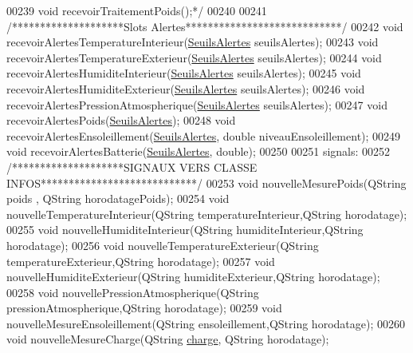 \begin{DoxyCode}
00239 \textcolor{comment}{        void recevoirTraitementPoids();*/}
00240 
00241         \textcolor{comment}{/********************Slots Alertes****************************/}
00242         \textcolor{keywordtype}{void} recevoirAlertesTemperatureInterieur(\hyperlink{parametres_8h_aaa6de8207c94675264c90b10b613368d}{SeuilsAlertes} seuilsAlertes);
00243         \textcolor{keywordtype}{void} recevoirAlertesTemperatureExterieur(\hyperlink{parametres_8h_aaa6de8207c94675264c90b10b613368d}{SeuilsAlertes} seuilsAlertes);
00244         \textcolor{keywordtype}{void} recevoirAlertesHumiditeInterieur(\hyperlink{parametres_8h_aaa6de8207c94675264c90b10b613368d}{SeuilsAlertes} seuilsAlertes);
00245         \textcolor{keywordtype}{void} recevoirAlertesHumiditeExterieur(\hyperlink{parametres_8h_aaa6de8207c94675264c90b10b613368d}{SeuilsAlertes} seuilsAlertes);
00246         \textcolor{keywordtype}{void} recevoirAlertesPressionAtmospherique(\hyperlink{parametres_8h_aaa6de8207c94675264c90b10b613368d}{SeuilsAlertes} seuilsAlertes);
00247         \textcolor{keywordtype}{void} recevoirAlertesPoids(\hyperlink{parametres_8h_aaa6de8207c94675264c90b10b613368d}{SeuilsAlertes});
00248         \textcolor{keywordtype}{void} recevoirAlertesEnsoleillement(\hyperlink{parametres_8h_aaa6de8207c94675264c90b10b613368d}{SeuilsAlertes}, \textcolor{keywordtype}{double} niveauEnsoleillement);
00249         \textcolor{keywordtype}{void} recevoirAlertesBatterie(\hyperlink{parametres_8h_aaa6de8207c94675264c90b10b613368d}{SeuilsAlertes}, \textcolor{keywordtype}{double});
00250 
00251     signals:
00252         \textcolor{comment}{/********************SIGNAUX VERS CLASSE INFOS****************************/}
00253         \textcolor{keywordtype}{void} nouvelleMesurePoids(QString poids , QString horodatagePoids); 
00254         \textcolor{keywordtype}{void} nouvelleTemperatureInterieur(QString temperatureInterieur,QString horodatage); 
00255         \textcolor{keywordtype}{void} nouvelleHumiditeInterieur(QString humiditeInterieur,QString horodatage); 
00256         \textcolor{keywordtype}{void} nouvelleTemperatureExterieur(QString temperatureExterieur,QString horodatage); 
00257         \textcolor{keywordtype}{void} nouvelleHumiditeExterieur(QString humiditeExterieur,QString horodatage); 
00258         \textcolor{keywordtype}{void} nouvellePressionAtmospherique(QString pressionAtmospherique,QString horodatage); 
00259         \textcolor{keywordtype}{void} nouvelleMesureEnsoleillement(QString ensoleillement,QString horodatage); 
00260         \textcolor{keywordtype}{void} nouvelleMesureCharge(QString \hyperlink{struct_donnees_batterie_a4d3cf76cf1722835a6449bc4a29e761b}{charge}, QString horodatage);

\end{DoxyCode}
